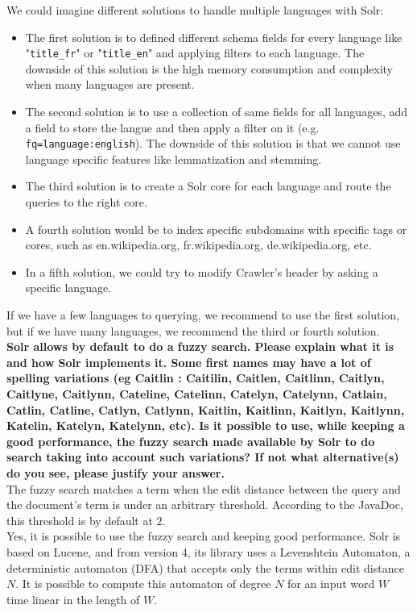 \documentclass[a4paper]{article}
\begin{document}
We could imagine different solutions to handle multiple languages with Solr:
\begin{itemize}  
    \item The first solution is to defined different schema fields for every language like "\texttt{title\_fr}" or "\texttt{title\_en}" and applying filters to each language. The downside of this solution is the high memory consumption and complexity when many languages are present.
    \item The second solution is to use a collection of same fields for all languages, add a field to store the langue and then apply a filter on it (e.g. \texttt{fq=language:english}). The downside of this solution is that we cannot use language specific features like lemmatization and stemming.
    \item The third solution is to create a Solr core for each language and route the queries to the right core.
    \item A fourth solution would be to index specific subdomains with specific tags or cores, such as en.wikipedia.org, fr.wikipedia.org, de.wikipedia.org, etc.
    \item In a fifth solution, we could try to modify Crawler's header by asking a specific language.
\end{itemize}
If we have a few languages to querying, we recommend to use the first solution, but if we have many languages, we recommend the third or fourth solution. \\

\textbf{Solr allows by default to do a fuzzy search. Please explain what it is and how Solr implements it. Some first names may have a lot of spelling variations (eg Caitlin : Caitilin, Caitlen, Caitlinn, Caitlyn, Caitlyne, Caitlynn, Cateline, Catelinn, Catelyn, Catelynn, Catlain, Catlin, Catline, Catlyn, Catlynn, Kaitlin, Kaitlinn, Kaitlyn, Kaitlynn, Katelin, Katelyn, Katelynn, etc). Is it possible to use, while keeping a good performance, the fuzzy search made available by Solr to do search taking into account such variations? If not what alternative(s) do you see, please justify your answer.} \\

The fuzzy search matches a term when the edit distance between the query and the document's term is under an arbitrary threshold. According to the JavaDoc, this threshold is by default at $2$. \\

Yes, it is possible to use the fuzzy search and keeping good performance. Solr is based on Lucene, and from version 4, its library uses a Levenshtein Automaton, a deterministic automaton (DFA) that accepts only the terms within edit distance $N$. It is possible to compute this automaton of degree $N$ for an input word $W$ time linear in the length of $W$. \\
\end{document}
